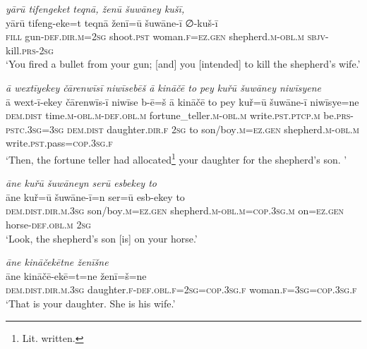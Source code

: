\ea \label{KŠ.98}
\textit{yārū tifengeket teqnā, ženū šuwāney kušī,} \\ 
\gll yārū tifeng-eke=t teqnā ženī=ū šuwāne-ī ∅-kuš-ī \\ 
 \textsc{fill} gun\textsc{-def}\textsc{.dir}\textsc{.m}\textsc{=\textsc{2sg}} shoot\textsc{.pst} woman\textsc{.f}\textsc{\textsc{=ez.gen}} shepherd\textsc{.m}\textsc{-obl}\textsc{.m} \textsc{sbjv-}kill\textsc{.prs}-\textsc{2sg} \\ 
\glt `You fired a bullet from your gun; [and] you [intended] to kill the shepherd’s wife.'
\z 
 
\ea \label{KŠ.99}
\textit{ā wextīyekey čārenwīsī niwīsebēš ā kināčē to pey kuřū šuwāney niwīsyene} \\ 
\gll ā wext-ī-ekey čārenwīs-ī niwīse b-ē=š ā kināčē to pey kuř=ū šuwāne-ī niwīsye=ne \\ 
 \textsc{dem.dist} time\textsc{.m}\textsc{-obl}\textsc{.m}\textsc{-def}\textsc{.obl}\textsc{.m} fortune\_teller\textsc{.m}\textsc{-obl}\textsc{.m} write\textsc{.pst}\textsc{.ptcp}\textsc{.m} be\textsc{.prs}\textsc{-pstc}\textsc{.3sg}\textsc{=3sg} \textsc{dem.dist} daughter\textsc{.dir}\textsc{.f} \textsc{2sg} to son/boy\textsc{.m}\textsc{\textsc{=ez.gen}} shepherd\textsc{.m}\textsc{-obl}\textsc{.m} write\textsc{.pst}.pass\textsc{=cop}\textsc{.3sg}\textsc{.f} \\ 
\glt `Then, the fortune teller had allocated\footnote{Lit. written.} your daughter for the shepherd’s son. '
\z 
 
\ea \label{KŠ.100}
\textit{āne kuřū šuwāneyn serū esbekey to} \\ 
\gll āne kuř=ū šuwāne-ī=n ser=ū esb-ekey to \\ 
 \textsc{dem.dist}\textsc{.dir}\textsc{.m}\textsc{.3sg} son/boy\textsc{.m}\textsc{\textsc{=ez.gen}} shepherd\textsc{.m}\textsc{-obl}\textsc{.m}\textsc{=cop}\textsc{.3sg}\textsc{.m} on\textsc{\textsc{=ez.gen}} horse\textsc{-def}\textsc{.obl}\textsc{.m} \textsc{2sg} \\ 
\glt `Look, the shepherd’s son [is] on your horse.'
\z 
 
\ea \label{KŠ.101}
\textit{āne kināčekētne ženīšne} \\ 
\gll āne kināčē-ekē=t=ne ženī=š=ne \\ 
 \textsc{dem.dist}\textsc{.dir}\textsc{.m}\textsc{.3sg} daughter\textsc{.f}\textsc{-def}\textsc{.obl}\textsc{.f}\textsc{=\textsc{2sg}}\textsc{=cop}\textsc{.3sg}\textsc{.f} woman\textsc{.f}\textsc{=3sg}\textsc{=cop}\textsc{.3sg}\textsc{.f} \\ 
\glt `That is your daughter. She is his wife.'
\z 
 
